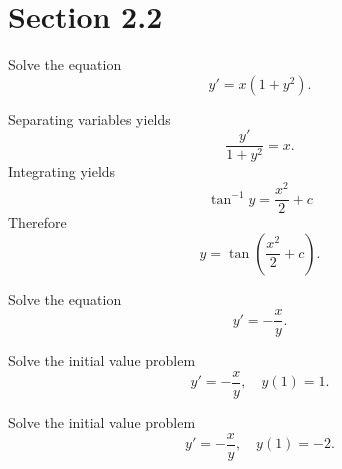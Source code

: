 \section*{Section 2.2}
\setcounter{chapter}{2}
\setcounter{section}{2}

\setcounter{example}{0}
\begin{example}
  \label{example:2.2.1}\rm Solve the equation
  \[
    y'=x(1+y^{2}).
  \]
\end{example}
\begin{examplesolution}
\solution Separating variables yields
\[
  \frac{y'}{1+y^{2}}=x.
\]
Integrating yields
\[
  \tan^{-1}y=\frac{x^{2}}{2}+c
\]
Therefore
\[
  y=\tan\left(\frac{x^{2}}{2}+c\right).
\]
\end{examplesolution}

\setcounter{example}{1}
\setcounter{equation}{3}
\begin{example}
  \label{example:2.2.2} \rm \mbox{}
  \newline
  \begin{alist}
    \item %
    Solve the equation
    \begin{equation}
      \label{eq:2.2.4}y'=-\frac{x}{y}.
    \end{equation}

    \item %
    Solve the initial value problem
    \begin{equation}
      \label{eq:2.2.5}y'=-\frac{x}{y},\quad y(1)=1.
    \end{equation}

    \item %
    Solve the initial value problem
    \begin{equation}
      \label{eq:2.2.6}y'=-\frac{x}{y},\quad y(1)=-2.
    \end{equation}
  \end{alist}
\end{example}
\setcounter{equation}{6}
\setcounter{figure}{0}
